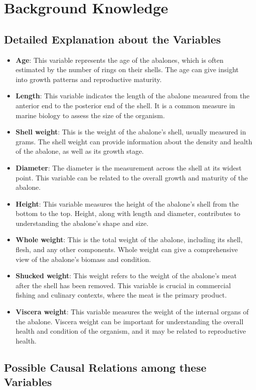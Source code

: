 \documentclass{article}
\begin{document}
\section{Background Knowledge}
\subsection{Detailed Explanation about the Variables}
\begin{itemize}
\item \textbf{Age}: This variable represents the age of the abalones, which is often estimated by the number of rings on their shells. The age can give insight into growth patterns and reproductive maturity.
\item \textbf{Length}: This variable indicates the length of the abalone measured from the anterior end to the posterior end of the shell. It is a common measure in marine biology to assess the size of the organism.
\item \textbf{Shell weight}: This is the weight of the abalone’s shell, usually measured in grams. The shell weight can provide information about the density and health of the abalone, as well as its growth stage.
\item \textbf{Diameter}: The diameter is the measurement across the shell at its widest point. This variable can be related to the overall growth and maturity of the abalone.
\item \textbf{Height}: This variable measures the height of the abalone's shell from the bottom to the top. Height, along with length and diameter, contributes to understanding the abalone's shape and size.
\item \textbf{Whole weight}: This is the total weight of the abalone, including its shell, flesh, and any other components. Whole weight can give a comprehensive view of the abalone's biomass and condition.
\item \textbf{Shucked weight}: This weight refers to the weight of the abalone's meat after the shell has been removed. This variable is crucial in commercial fishing and culinary contexts, where the meat is the primary product.
\item \textbf{Viscera weight}: This variable measures the weight of the internal organs of the abalone. Viscera weight can be important for understanding the overall health and condition of the organism, and it may be related to reproductive health.
\end{itemize}

\subsection{Possible Causal Relations among these Variables}
\end{document}
